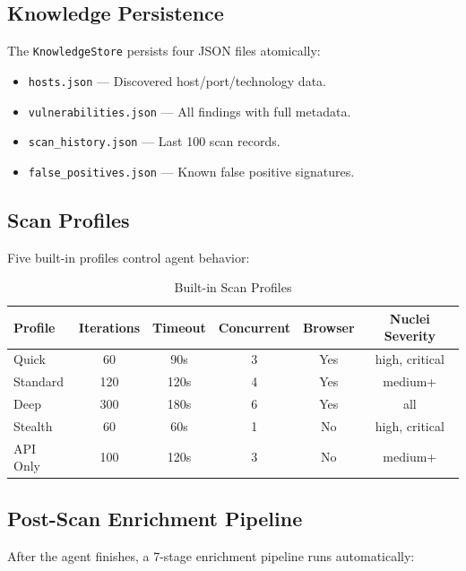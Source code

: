 \documentclass[12pt,a4paper]{article}
\begin{document}
\subsection{Knowledge Persistence}

The \texttt{KnowledgeStore} persists four JSON files atomically:
\begin{itemize}
    \item \texttt{hosts.json} — Discovered host/port/technology data.
    \item \texttt{vulnerabilities.json} — All findings with full metadata.
    \item \texttt{scan\_history.json} — Last 100 scan records.
    \item \texttt{false\_positives.json} — Known false positive signatures.
\end{itemize}

\subsection{Scan Profiles}

Five built-in profiles control agent behavior:

\begin{table}[H]
\centering
\begin{tabular}{lccccc}
\toprule
\textbf{Profile} & \textbf{Iterations} & \textbf{Timeout} &
\textbf{Concurrent} & \textbf{Browser} & \textbf{Nuclei Severity} \\
\midrule
Quick    & 60  & 90s  & 3 & Yes & high, critical \\
Standard & 120 & 120s & 4 & Yes & medium+ \\
Deep     & 300 & 180s & 6 & Yes & all \\
Stealth  & 60  & 60s  & 1 & No  & high, critical \\
API Only & 100 & 120s & 3 & No  & medium+ \\
\bottomrule
\end{tabular}
\caption{Built-in Scan Profiles}
\end{table}

\subsection{Post-Scan Enrichment Pipeline}

After the agent finishes, a 7-stage enrichment pipeline runs automatically:
\end{document}
